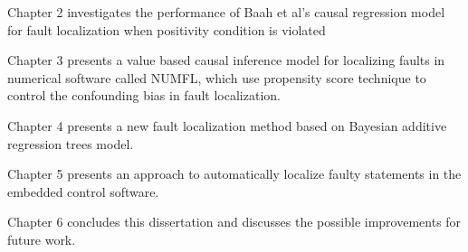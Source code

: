 Chapter 2 investigates the performance of Baah et al’s causal regression model for fault localization when positivity condition is violated

Chapter 3 presents a value based causal inference model for localizing faults in numerical software called NUMFL, which use propensity score technique to control the confounding bias in fault localization.

Chapter 4 presents a new fault localization method based on Bayesian additive regression trees model.

Chapter 5 presents an approach to automatically localize faulty statements in the embedded control software.

Chapter 6 concludes this dissertation and discusses the possible improvements for future work.



